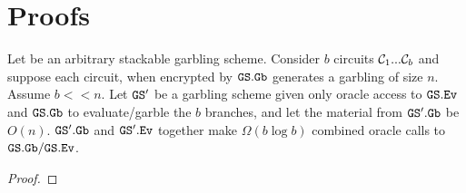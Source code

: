 \section{Proofs}\label{sec:proof}

\begin{lemma}
  Let \GS be an arbitrary stackable garbling scheme.
  Consider $b$ circuits $\mathcal C_1...\mathcal C_b$ and suppose each circuit,
  when encrypted by $\mathtt{GS}.\mathtt{Gb}$ generates a garbling of size $n$. Assume
  $b << n$.
  Let $\mathtt{GS}'$ be a garbling scheme given only oracle access to
  $\mathtt{GS}.\mathtt{Ev}$ and $\mathtt{GS}.\mathtt{Gb}$ to evaluate/garble the $b$ branches, and let
  the material from $\mathtt{GS}'.\mathtt{Gb}$ be $O(n)$.
  $\mathtt{GS}'.\mathtt{Gb}$ and $\mathtt{GS}'.\mathtt{Ev}$ together make $\Omega(b \log b)$ combined oracle calls
  to $\mathtt{GS}.\mathtt{Gb}/\mathtt{GS}.\mathtt{Ev}$.
\end{lemma}
\begin{proof}
\end{proof}
